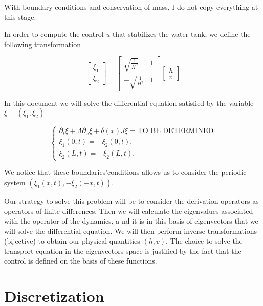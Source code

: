 \documentclass[a4paper]{article}
\begin{document}
With boundary conditions and conservation of mass, I do not copy everything at this stage.

In order to compute the control $u$ that stabilizes the water tank,
we define the following transformation

\[
\begin{bmatrix}
	\xi_1 \\
	\xi_2
\end{bmatrix} 
=
\begin{bmatrix}
	\sqrt{\frac{1}{H^\gamma}} & 1 \\
	- \sqrt{\frac{1}{H^\gamma}} & 1
\end{bmatrix} 
\begin{bmatrix}
	h \\
	v
\end{bmatrix} 
\]


In this document we will solve the differential equation satisfied by the variable $\xi = (\xi_1,\xi_2)$


\begin{equation}
	\label{def:transport}
	\begin{cases}
		\partial_t \xi + \Lambda \partial_x \xi + \delta(x) J \xi = \text{TO BE DETERMINED} \\
		\xi_1 (0,t) = -\xi_2 (0,t) ,\\
		\xi_2 (L,t) = -\xi_2(L,t).
	\end{cases}
\end{equation}

We notice that these boundaries'conditions allows us to consider the periodic system $(\xi_1 (x,t), -\xi_2(-x,t))$.

Our strategy to solve this problem will be to consider the derivation operators as operators of finite differences. 
Then we will calculate the eigenvalues associated with the operator of the dynamics, a
nd it is in this basis of eigenvectors that we will solve the differential equation. 
We will then perform inverse transformations (bijective) to obtain our physical quantities $ (h, v) $. 
The choice to solve the transport equation in the eigenvectors space is justified 
by the fact that the control is defined on the basis of these functions.


\section{Discretization}
\end{document}
